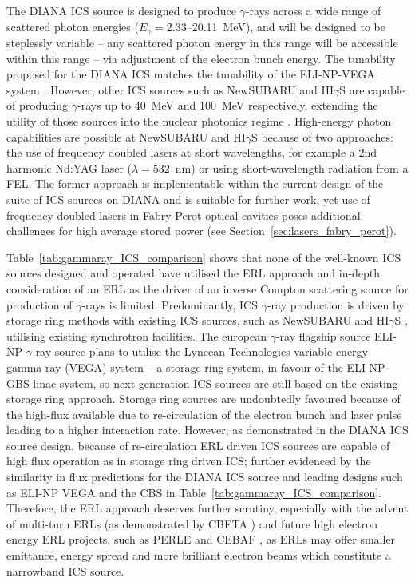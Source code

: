 \documentclass[../main.tex]{subfiles}
\begin{document}
The DIANA ICS source is designed to produce $\gamma$-rays across a wide range of scattered photon energies ($E_{\gamma}=$2.33--20.11~\si{\mega\electronvolt}), and will be designed to be steplessly variable -- any scattered photon energy in this range will be accessible within this range -- via adjustment of the electron bunch energy. The tunability proposed for the DIANA ICS matches the tunability of the ELI-NP-VEGA system \cite{tanaka2020current,elinp2019vega}. However, other ICS sources such as NewSUBARU and HI$\gamma$S are capable of producing $\gamma$-rays up to 40~\si{\mega\electronvolt} and 100~\si{\mega\electronvolt} respectively, extending the utility of those sources into the nuclear photonics regime \cite{budker2021expanding}. High-energy photon capabilities are possible at NewSUBARU and HI$\gamma$S because of two approaches: the use of frequency doubled lasers at short wavelengths, for example a 2nd harmonic Nd:YAG laser ($\lambda = 532$~\si{\nano\meter}) or using short-wavelength radiation from a FEL. The former approach is implementable within the current design of the suite of ICS sources on DIANA and is suitable for further work, yet use of frequency doubled lasers in Fabry-Perot optical cavities poses additional challenges for high average stored power (see Section~\ref{sec:lasers_fabry_perot}).

Table~\ref{tab:gammaray_ICS_comparison} shows that none of the well-known ICS sources designed and operated have utilised the ERL approach and in-depth consideration of an ERL as the driver of an inverse Compton scattering source for production of $\gamma$-rays is limited. Predominantly, ICS $\gamma$-ray production is driven by storage ring methods with existing ICS sources, such as NewSUBARU \cite{utsunomiya2015gamma} and HI$\gamma$S \cite{weller2009research}, utilising existing synchrotron facilities. The european $\gamma$-ray flagship source ELI-NP $\gamma$-ray source plans to utilise the Lyncean Technologies variable energy gamma-ray (VEGA) system \cite{tanaka2020current,elinp2019vega} -- a storage ring system, in favour of the ELI-NP-GBS \cite{adriani2014technical} linac system, so next generation ICS sources are still based on the existing storage ring approach. Storage ring sources are undoubtedly favoured because of the high-flux available due to re-circulation of the electron bunch and laser pulse leading to a higher interaction rate. However, as demonstrated in the DIANA ICS source design, because of re-circulation ERL driven ICS sources are capable of high flux operation as in storage ring driven ICS; further evidenced by the similarity in flux predictions for the DIANA ICS source and leading designs such as ELI-NP VEGA and the CBS \cite{pan2019design} in Table~\ref{tab:gammaray_ICS_comparison}. Therefore, the ERL approach deserves further scrutiny, especially with the advent of multi-turn ERLs (as demonstrated by CBETA \cite{bartnik2020cbeta}) and future high electron energy ERL projects, such as PERLE \cite{angal2018perle} and CEBAF \cite{meot2016er}, as ERLs may offer smaller emittance, energy spread and more brilliant electron beams which constitute a narrowband ICS source.
\end{document}
